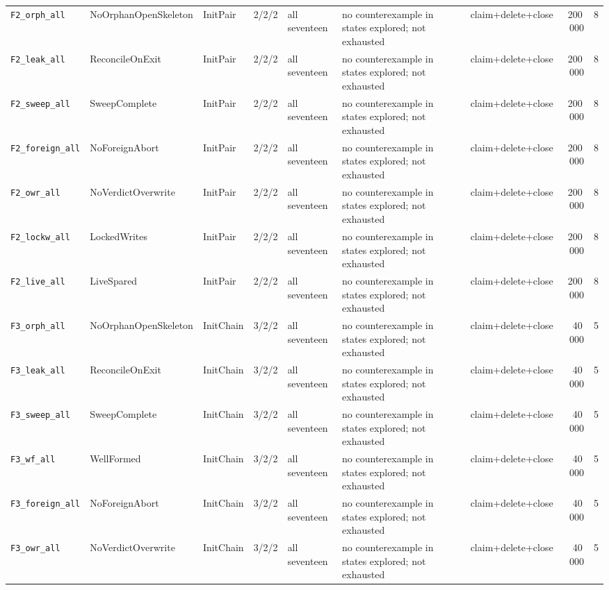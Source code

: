 \documentclass[a4paper,10pt,fleqn]{article}
\begin{document}
{\begin{center}
\begin{tabularx}{\textwidth}{@{}l l l l X X l r r@{}}
\texttt{F2\_orph\_all} & NoOrphanOpenSkeleton & InitPair & 2/2/2 & all seventeen & no counterexample in states explored; not exhausted & claim+delete+close & 200\,000 & 8 \\
\texttt{F2\_leak\_all} & ReconcileOnExit & InitPair & 2/2/2 & all seventeen & no counterexample in states explored; not exhausted & claim+delete+close & 200\,000 & 8 \\
\texttt{F2\_sweep\_all} & SweepComplete & InitPair & 2/2/2 & all seventeen & no counterexample in states explored; not exhausted & claim+delete+close & 200\,000 & 8 \\
\texttt{F2\_foreign\_all} & NoForeignAbort & InitPair & 2/2/2 & all seventeen & no counterexample in states explored; not exhausted & claim+delete+close & 200\,000 & 8 \\
\texttt{F2\_owr\_all} & NoVerdictOverwrite & InitPair & 2/2/2 & all seventeen & no counterexample in states explored; not exhausted & claim+delete+close & 200\,000 & 8 \\
\texttt{F2\_lockw\_all} & LockedWrites & InitPair & 2/2/2 & all seventeen & no counterexample in states explored; not exhausted & claim+delete+close & 200\,000 & 8 \\
\texttt{F2\_live\_all} & LiveSpared & InitPair & 2/2/2 & all seventeen & no counterexample in states explored; not exhausted & claim+delete+close & 200\,000 & 8 \\
\texttt{F3\_orph\_all} & NoOrphanOpenSkeleton & InitChain & 3/2/2 & all seventeen & no counterexample in states explored; not exhausted & claim+delete+close & 40\,000 & 5 \\
\texttt{F3\_leak\_all} & ReconcileOnExit & InitChain & 3/2/2 & all seventeen & no counterexample in states explored; not exhausted & claim+delete+close & 40\,000 & 5 \\
\texttt{F3\_sweep\_all} & SweepComplete & InitChain & 3/2/2 & all seventeen & no counterexample in states explored; not exhausted & claim+delete+close & 40\,000 & 5 \\
\texttt{F3\_wf\_all} & WellFormed & InitChain & 3/2/2 & all seventeen & no counterexample in states explored; not exhausted & claim+delete+close & 40\,000 & 5 \\
\texttt{F3\_foreign\_all} & NoForeignAbort & InitChain & 3/2/2 & all seventeen & no counterexample in states explored; not exhausted & claim+delete+close & 40\,000 & 5 \\
\texttt{F3\_owr\_all} & NoVerdictOverwrite & InitChain & 3/2/2 & all seventeen & no counterexample in states explored; not exhausted & claim+delete+close & 40\,000 & 5 \\

\end{tabularx}
\end{center}}
\end{document}
